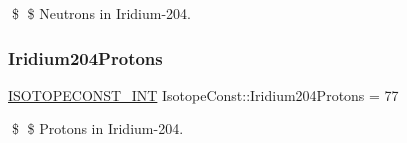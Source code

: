 \$ \$ Neutrons in Iridium-\/204. \mbox{\label{group___isotope_const-_iridium-_ir204_gab9dc7775f5900b2ea9f49e481ea5aef7}} 
\subsubsection{\texorpdfstring{Iridium204\+Protons}{Iridium204Protons}}
{\footnotesize\ttfamily \mbox{\hyperlink{group___isotope_const-_macros_ga5f18360b3e99483a35c32d789e62621c}{I\+S\+O\+T\+O\+P\+E\+C\+O\+N\+S\+T\+\_\+\+I\+NT}} Isotope\+Const\+::\+Iridium204\+Protons = 77}

\$ \$ Protons in Iridium-\/204. 